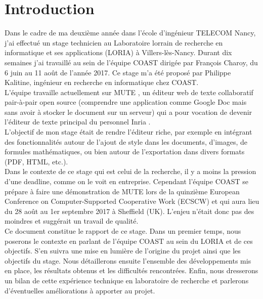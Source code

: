\documentclass[12pt]{article}
\begin{document}
\section*{Introduction}
Dans le cadre de ma deuxième année dans l'école d'ingénieur TELECOM Nancy, j'ai effectué un stage technicien au Laboratoire lorrain de recherche en informatique et ses applications (LORIA) \cite{loria} à Villers-lès-Nancy. Durant dix semaines j'ai travaillé au sein de l'équipe COAST \cite{coast} dirigée par François Charoy, du 6 juin au 11 août de l'année 2017. Ce stage m'a été proposé par Philippe Kalitine, ingénieur en recherche en informatique chez COAST.\\

L'équipe travaille actuellement sur MUTE \cite{mute}, un éditeur web de texte collaboratif pair-à-pair open source (comprendre une application comme Google Doc mais sans avoir à stocker le document sur un serveur) qui a pour vocation de devenir l'éditeur de texte principal du personnel Inria \cite{inria}.\\

L'objectif de mon stage était de rendre l'éditeur riche, par exemple en intégrant des fonctionnalités autour de l'ajout de style dans les documents, d'images, de formules mathématiques, ou bien autour de l'exportation dans divers formats (PDF, HTML, etc.).\\

Dans le contexte de ce stage qui est celui de la recherche, il y a moins la pression d'une deadline, comme on le voit en entreprise. Cependant l'équipe COAST se prépare à faire une démonstration de MUTE lors de la quinzième European Conference on Computer-Supported Cooperative Work (ECSCW) \cite{ecscw} et qui aura lieu du 28 août au 1er septembre 2017 à Sheffield (UK). L'enjeu n'était donc pas des moindres et suggérait un travail de qualité.\\

Ce document constitue le rapport de ce stage. Dans un premier temps, nous poserons le contexte en parlant de l'équipe COAST au sein du LORIA et de ces objectifs. S'en suivra une mise en lumière de l'origine du projet ainsi que les objectifs du stage. Nous détaillerons ensuite l'ensemble des développements mis en place, les résultats obtenus et les difficultés rencontrées. Enfin, nous dresserons un bilan de cette expérience technique en laboratoire de recherche et parlerons d'éventuelles améliorations à apporter au projet.\\
\end{document}
